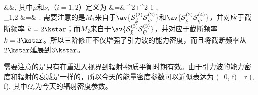 &&\times {},
\n
其中$\mu$和$\nu_i$（$i=1,2$）定义为
\m
\mu &=& {\tp^2+\tk^2-1 \tp \tk}, \\
\nu_{1,2} &=& .
\n
需要注意的是$M_1$来自于$\av{\mathcal{S}^{(2)}_{\vec{k}} \mathcal{S}^{(2)}_{\vec{k'}}}$和$\av{\mathcal{S}^{(2)}_{\vec{k}} \mathcal{S}^{(4)}_{\vec{k'}}}$，并对应于截断频率 $k=2\kstar$；而$M_2$来自于$\av{\mathcal{S}^{(3)}_{\vec{k}} \mathcal{S}^{(3)}_{\vec{k'}}}$，并对应于截断频率$k=3\kstar$。所以三阶修正不仅增强了引力波的能力密度，而且将截断频率从$2\kstar$延展到$3\kstar$。

需要注意的是只有在重进入视界到辐射-物质平衡时期有效。由于引力波的能力密度和辐射的衰减是一样的，所以今天的能量密度参数可以近似表达为\cite{Espinosa:2017sgp}
\e
\ogw(\eta_0, f) \simeq \Omega_{r} \times \ogw(\eta, f),
\q
其中$\Omega_{r}$为今天的辐射密度参数。


